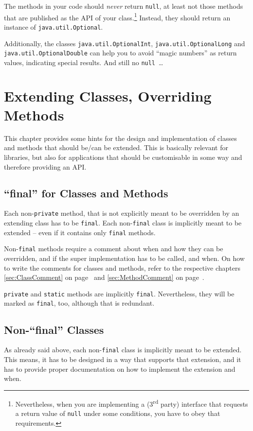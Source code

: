 \documentclass[11pt,a4paper, titlepage, parskip=half, headsepline, footsepline, cleardoublepage=current, headheight=1cm]{scrbook}
\newcommand*{\tqvref}[1]{\hyperref[{#1}]{\ref*{#1}} on page~\pageref{#1}}
\begin{document}
The methods in your code should \textit{never} return \lstinline|null|, at least not those methods that are published as the API of your class.\footnote{Nevertheless, when you are implementing a (3\textsuperscript{rd} party) interface that requests a return value of \lstinline|null| under some conditions, you have to obey that requirements.} Instead, they should return an instance of \lstinline|java.util.Optional|\autocite{ORACLE_DOC_OPTIONAL_CLASS}.

Additionally, the classes \lstinline|java.util.OptionalInt|\autocite{ORACLE_DOC_OPTIONALINT_CLASS}, \lstinline|java.util.OptionalLong|\autocite{ORACLE_DOC_OPTIONALLONG_CLASS} and \lstinline|java.util.OptionalDouble|\autocite{ORACLE_DOC_OPTIONALDOUBLE_CLASS} can help you to avoid “magic numbers” as return values, indicating special results. And still no \lstinline|null|~…

\section{Extending Classes, Overriding Methods}\label{sec:ExtendingClassesOverridingMethods}
This chapter provides some hints for the design and implementation of classes and methods that should be/can be extended. This is basically relevant for libraries, but also for applications that should be customisable in some way and therefore providing an API.

\subsection{“final” for Classes and Methods}
Each non-\lstinline|private| method, that is not explicitly meant to be overridden by an extending class has to be \lstinline|final|. Each non-\lstinline|final| class is implicitly meant to be extended – even if it contains only \lstinline|final| methods.

Non-\lstinline|final| methods require a comment about when and how they can be overridden, and if the super implementation has to be called, and when. On how to write the comments for classes and methods, refer to the respective chapters \tqvref{sec:ClassComment} and \tqvref{sec:MethodComment}.

\lstinline|private| and \lstinline|static| methods are implicitly \lstinline|final|. Nevertheless, they will be marked as \lstinline|final|, too, although that is redundant.

\subsection{Non-“final” Classes}\label{sec:NonFinalClasses}
As already said above, each non-\lstinline|final| class is implicitly meant to be extended. This means, it has to be designed in a way that supports that extension, and it has to provide proper documentation on how to implement the extension and when.
\end{document}
